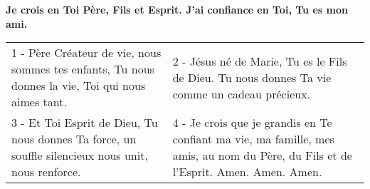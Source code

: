 \textbf{Je crois en Toi Père, Fils et Esprit. J’ai confiance en Toi, Tu es mon ami.}


\begin{tabular}{p{} p{}}
1 - Père Créateur de vie, nous sommes tes enfants, Tu nous donnes la vie, 
  Toi qui nous aimes tant.
&
2 - Jésus né de Marie, Tu es le Fils de Dieu. Tu nous 
  donnes Ta vie comme un cadeau précieux.
\\
3 - Et Toi Esprit de Dieu, Tu nous 
  donnes Ta force, un souffle silencieux nous unit, nous renforce.
&
4 - Je crois 
 que je grandis en Te confiant ma vie, ma famille, mes amis, au nom du Père, 
  du Fils et de l’Esprit.\newline
  Amen. Amen. Amen. 
\end{tabular}


